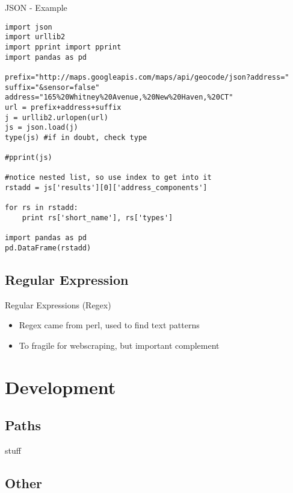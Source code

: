 \documentclass[presentation]{beamer}
\begin{document}
\begin{frame}[fragile,shrink=1,label=sec-5-3-3]{JSON - Example}


 \lstset{numbers=left,language=Python,label= ,caption= }
\begin{lstlisting}
import json
import urllib2
import pprint import pprint
import pandas as pd

prefix="http://maps.googleapis.com/maps/api/geocode/json?address="
suffix="&sensor=false"
address="165%20Whitney%20Avenue,%20New%20Haven,%20CT"
url = prefix+address+suffix
j = urllib2.urlopen(url)
js = json.load(j)
type(js) #if in doubt, check type

#pprint(js) 

#notice nested list, so use index to get into it
rstadd = js['results'][0]['address_components']

for rs in rstadd:
    print rs['short_name'], rs['types']

import pandas as pd
pd.DataFrame(rstadd)
\end{lstlisting}
\end{frame}


\subsection{Regular Expression}
\label{sec-5-4}

\begin{frame}[label=sec-5-4-1]{Regular Expressions (Regex)}
\begin{itemize}
\item Regex came from perl, used to find text patterns
\item To fragile for webscraping, but important complement
\end{itemize}
\end{frame}


\section{Development}
\label{sec-6}

\subsection{Paths}
\label{sec-6-1}

stuff

\subsection{Other}
\label{sec-6-2}
\end{document}
